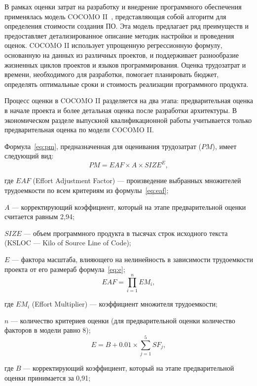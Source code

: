 В рамках оценки затрат на разработку и внедрение программного обеспечения применялась модель COCOMO II~\cite{bib:cocomoii_gen, bib:cocomoii_win}, представляющая собой алгоритм для определения стоимости создания ПО. Эта модель предлагает ряд преимуществ и предоставляет детализированное описание методик настройки и проведения оценок. COCOMO II использует упрощенную регрессионную формулу, основанную на данных из различных проектов, и поддерживает разнообразие жизненных циклов проектов и языков программирования. Оценка трудозатрат и времени, необходимого для разработки, помогает планировать бюджет, определять оптимальные сроки и стоимость реализации программного продукта.

Процесс оценки в COCOMO II разделяется на два этапа: предварительная оценка в начале проекта и более детальная оценка после разработки архитектуры. В экономическом разделе выпускной квалификационной работы учитывается только предварительная оценка по модели COCOMO II.

Формула~\ref{eq:pm}, предназначенная для оценивания трудозатрат ($PM$), имеет следующий вид:
\begin{equation}
    PM = EAF \times A \times SIZE^E,
    \label{eq:pm}
\end{equation}

где $EAF$ (Effort Adjustment Factor) --- произведение выбранных множителей трудоемкости по всем критериям из формулы~\ref{eq:eaf};

$A$ --- корректирующий коэффициент, который на этапе предварительной оценки считается равным 2,94;

$SIZE$ --- объем программного продукта в тысячах строк исходного текста (KSLOC --- Kilo of Source Line of Code);

$E$ --- фактора масштаба, влияющего на нелинейность в зависимости трудоемкости проекта от его размераб формула~\ref{eq:e};
\begin{equation}
    EAF = \prod_{i=1}^n EM_i,
    \label{eq:eaf}
\end{equation}

где $EM_i$ (Effort Multiplier) --- коэффициент множителя трудоемкости;

$n$ --- количество критериев оценки (для предварительной оценки количество факторов в модели равно 8);
\begin{equation}
    E = B + 0.01 \times \sum_{j=1}^5 SF_j,
    \label{eq:e}
\end{equation}

где $B$ --- корректирующий коэффициент, который на этапе предварительной оценки принимается за 0,91;

